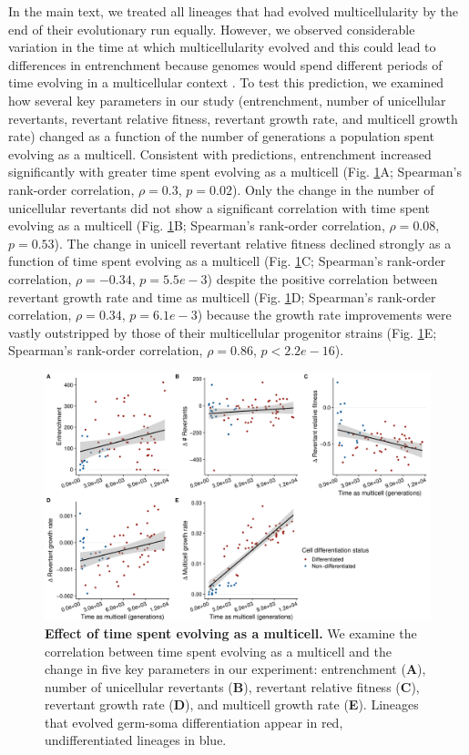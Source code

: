 \documentclass[
]{book}
\begin{document}
In the main text, we treated all lineages that had evolved multicellularity by the end of their evolutionary run equally. However, we observed considerable variation in the time at which multicellularity evolved and this could lead to differences in entrenchment because genomes would spend different periods of time evolving in a multicellular context \citep{libby2016stabilizing}. To test this prediction, we examined how several key parameters in our study (entrenchment, number of unicellular revertants, revertant relative fitness, revertant growth rate, and multicell growth rate) changed as a function of the number of generations a population spent evolving as a multicell. Consistent with predictions, entrenchment increased significantly with greater time spent evolving as a multicell (Fig. \ref{fig:dw-time-as-mc}A; Spearman's rank-order correlation, \(\rho=0.3\), \(p=0.02\)). Only the change in the number of unicellular revertants did not show a significant correlation with time spent evolving as a multicell (Fig. \ref{fig:dw-time-as-mc}B; Spearman's rank-order correlation, \(\rho=0.08\), \(p=0.53\)). The change in unicell revertant relative fitness declined strongly as a function of time spent evolving as a multicell (Fig. \ref{fig:dw-time-as-mc}C; Spearman's rank-order correlation, \(\rho=-0.34\), \(p=5.5e-3\)) despite the positive correlation between revertant growth rate and time as multicell (Fig. \ref{fig:dw-time-as-mc}D; Spearman's rank-order correlation, \(\rho=0.34\), \(p=6.1e-3\)) because the growth rate improvements were vastly outstripped by those of their multicellular progenitor strains (Fig. \ref{fig:dw-time-as-mc}E; Spearman's rank-order correlation, \(\rho=0.86\), \(p<2.2e-16\)).

\begin{figure}
\centering
\includegraphics{images/Figure_S8_Time_as_multicell_10NOV22.png}
\caption{\label{fig:dw-time-as-mc}\textbf{Effect of time spent evolving as a multicell.} We examine the correlation between time spent evolving as a multicell and the change in five key parameters in our experiment: entrenchment (\textbf{A}), number of unicellular revertants (\textbf{B}), revertant relative fitness (\textbf{C}), revertant growth rate (\textbf{D}), and multicell growth rate (\textbf{E}). Lineages that evolved germ-soma differentiation appear in red, undifferentiated lineages in blue.}
\end{figure}
\end{document}
